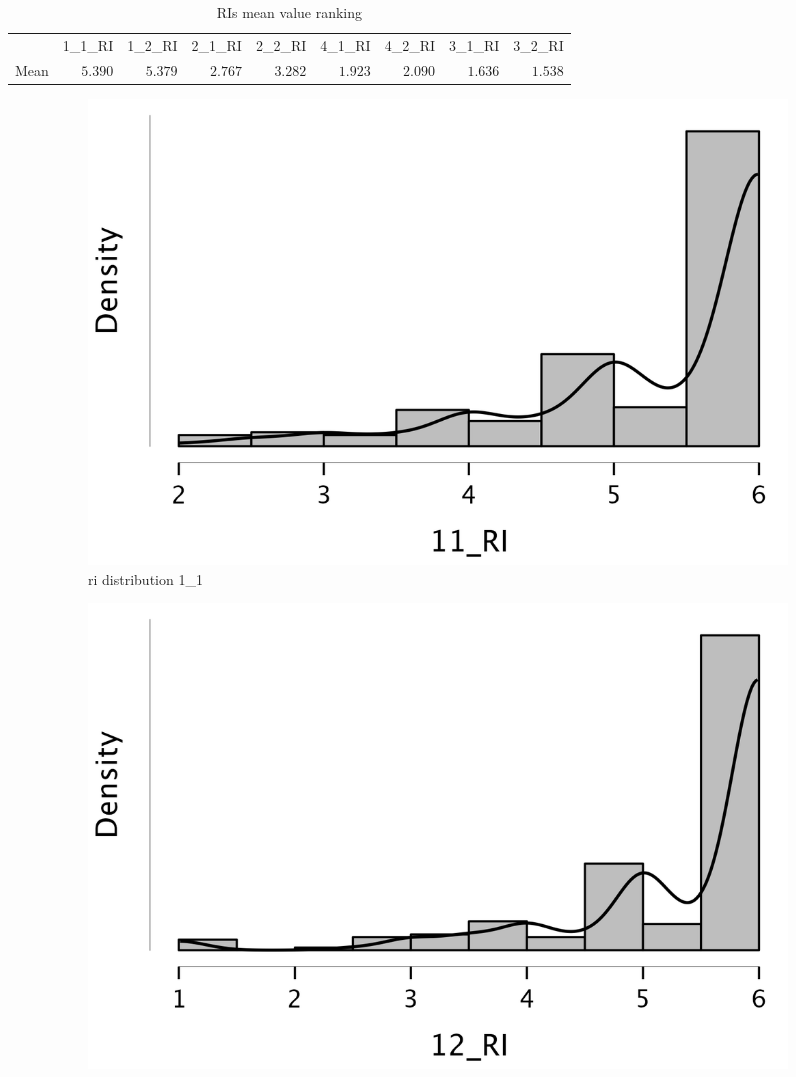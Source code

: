 \documentclass[
  a4paper,  %
  twoside,  %
  bibliography=totoc,
  headsepline,
  cleardoublepage=empty,
  parskip=half,
  draft=false
]{scrbook}
\begin{document}
\begin{table}[h]
	\centering
	\caption{RIs mean value ranking}
	\label{tab:RIs-mean}
	{
		\begin{tabular}{lrrrrrrrr}
			\toprule
			 & 1\_1\_RI & 1\_2\_RI & 2\_1\_RI & 2\_2\_RI & 4\_1\_RI & 4\_2\_RI & 3\_1\_RI & 3\_2\_RI  \\
			\cmidrule[0.4pt]{1-9}
			Mean & $5.390$ & $5.379$ & $2.767$ & $3.282$ & $1.923$ & $2.090$ & $1.636$ & $1.538$  \\
			\bottomrule
		\end{tabular}
	}
\end{table}
\begin{figure}[h]
  \centering
  \begin{subfigure}{0.3\textwidth}
    \includegraphics[width=\linewidth]{graphics/images/statistics/RIs/11_RI.png}
    \caption{\gls{ri} distribution 1\_1}
    \label{fig:RI11}
  \end{subfigure}
  \begin{subfigure}{0.3\textwidth}
    \includegraphics[width=\linewidth]{graphics/images/statistics/RIs/12_RI.png}

\end{subfigure}
\end{figure}
\end{document}
